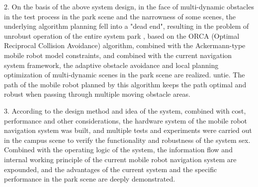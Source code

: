 \begin{abstract*}
  2. On the basis of the above system design, in the face of multi-dynamic obstacles in the test process in the park scene and the narrowness of some scenes, the underlying algorithm planning fell into a "dead end", resulting in the problem of unrobust operation of the entire system park , based on the ORCA (Optimal Reciprocal Collision Avoidance) algorithm, combined with the Ackermann-type mobile robot model constraints, and combined with the current navigation system framework, the adaptive obstacle avoidance and local planning optimization of multi-dynamic scenes in the park scene are realized. untie. The path of the mobile robot planned by this algorithm keeps the path optimal and robust when passing through multiple moving obstacle areas.

  3. According to the design method and idea of the system, combined with cost, performance and other considerations, the hardware system of the mobile robot navigation system was built, and multiple tests and experiments were carried out in the campus scene to verify the functionality and robustness of the system sex. Combined with the operating logic of the system, the information flow and internal working principle of the current mobile robot navigation system are expounded, and the advantages of the current system and the specific performance in the park scene are deeply demonstrated.
\end{abstract*}
